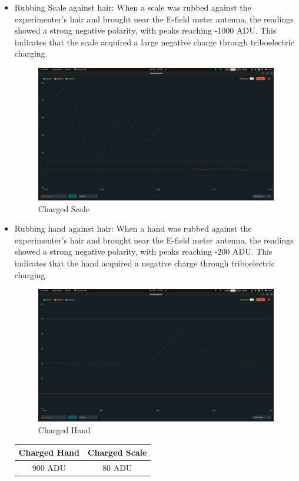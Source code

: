 \documentclass[a4paper,11pt]{article}%
\begin{document}
\begin{itemize}
  \item Rubbing Scale against hair: When a scale was rubbed against the experimenter's hair and brought near the E-field meter antenna, the readings showed a strong negative polarity, with peaks reaching -1000 ADU. This indicates that the scale acquired a large negative charge through triboelectric charging.
        \begin{figure}[H]
          \centering
          \includegraphics[scale=0.2]{figures/scale.png}
          \caption{Charged Scale}
        \end{figure}

  \item Rubbing hand against hair: When a hand was rubbed against the experimenter's hair and brought near the E-field meter antenna, the readings showed a strong negative polarity, with peaks reaching -200 ADU. This indicates that the hand acquired a negative charge through triboelectric charging.
        \begin{figure}[H]
          \centering
          \includegraphics[scale=0.2]{figures/hand.png}
          \caption{Charged Hand}
        \end{figure}

        \begin{table}[H]
          \centering
          \begin{tabular}{|c|c|}
            \hline
            Charged Hand & Charged Scale \\
            \hline
            900 ADU      & 80 ADU        \\
            \hline
          \end{tabular}
        \end{table}

\end{itemize}
\end{document}
